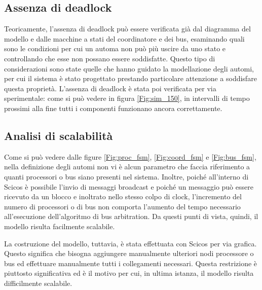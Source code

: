 \subsection{Assenza di deadlock}
Teoricamente, l'assenza di deadlock può essere verificata già dal diagramma del modello e dalle macchine a stati del coordinatore e dei bus, esaminando quali sono le condizioni per cui un automa non può più uscire da uno stato e controllando che esse non possano essere soddisfatte. Questo tipo di considerazioni sono state quelle che hanno guidato la modellazione degli automi, per cui il sistema è stato progettato prestando particolare attenzione a soddisfare questa proprietà. L'assenza di deadlock è stata poi verificata per via sperimentale: come si può vedere in figura \ref{Fig:sim_150}, in intervalli di tempo prossimi alla fine tutti i componenti funzionano ancora correttamente.

\subsection{Analisi di scalabilità}
Come si può vedere dalle figure \ref{Fig:proc_fsm}, \ref{Fig:coord_fsm} e \ref{Fig:bus_fsm}, nella definizione degli automi non vi è alcun parametro che faccia riferimento a quanti processori o bus siano presenti nel sistema. Inoltre, poiché all'interno di Scicos è possibile l'invio di messaggi broadcast e poiché un messaggio può essere ricevuto da un blocco e inoltrato nello stesso colpo di clock, l'incremento del numero di processori o di bus non comporta l'aumento del tempo necessario all'esecuzione dell'algoritmo di bus arbitration. Da questi punti di vista, quindi, il modello risulta facilmente scalabile.

La costruzione del modello, tuttavia, è stata effettuata con Scicos per via grafica. Questo significa che bisogna aggiungere manualmente ulteriori nodi processore o bus ed effettuare manualmente tutti i collegamenti necessari. Questa restrizione è piuttosto significativa ed è il motivo per cui, in ultima istanza, il modello risulta difficilmente scalabile.







